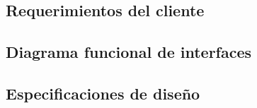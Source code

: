 \documentclass[../../main.tex]{subfiles}
\begin{document}
\subsection{Requerimientos del cliente}\label{subsec:requerimientos}


\subsection{Diagrama funcional de interfaces}\label{subsec:diag_funcional}


\subsection{Especificaciones de diseño}\label{subsec:especificaciones}

\end{document}
